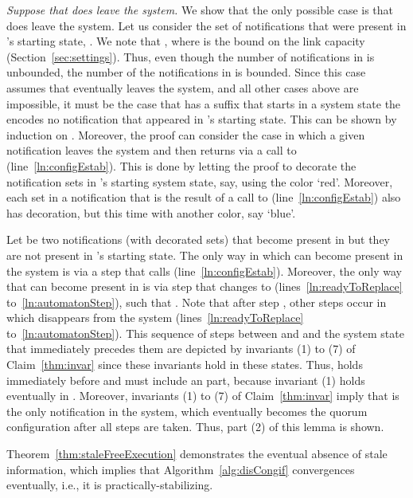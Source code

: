 \documentclass[11pt]{article}
\newenvironment{proof}{\noindent{\bf Proof.}}{\hfill}
\begin{document}
\begin{proof}
\noindent \textit{Suppose that  does leave the system.}
We show that the only possible case is that  does leave the system. Let us  consider the set  of notifications that were present in 's starting state, . We note that , where  is the bound on the link capacity (Section~\ref{sec:settings}). Thus, even though the number of notifications in  is unbounded, the number of the notifications in  is bounded. Since this case assumes that  eventually leaves the system, and all other cases above are impossible, it must be the case that  has a suffix  that starts in a system state  the encodes no notification that appeared in 's starting state. This can be shown by induction on . Moreover, the proof can consider the case in which a given notification  leaves the system and then returns via a call to  (line~\ref{ln:configEstab}). This is done by letting the proof to decorate the notification sets in 's starting system state, say, using the color `red'. Moreover, each set in a notification that is the result of a call to  (line~\ref{ln:configEstab}) also has  decoration, but this time with another color, say `blue'. 


Let  be two notifications (with decorated sets) that become present in  but they are not present in 's starting state. The only way in which   can become present in the system is via a step  that calls  (line~\ref{ln:configEstab}). Moreover, the only way that  can become present in  is via step  that changes  to  (lines~\ref{ln:readyToReplace} to~\ref{ln:automatonStep}), such that . 
Note that after step , other steps  occur in which  disappears from the system (lines~\ref{ln:readyToReplace} to~\ref{ln:automatonStep}). This sequence of steps between  and  and the system state that immediately precedes them are depicted by invariants (1) to (7) of Claim~\ref{thm:invar} since these invariants hold in these states. Thus,  holds immediately before  and  must include an  part, because invariant (1) holds eventually in . Moreover, invariants (1) to (7) of Claim~\ref{thm:invar} imply that  is the only notification in the system, which eventually becomes the quorum configuration after all steps  are taken. Thus, part (2) of this lemma is shown.  
\end{proof}




Theorem~\ref{thm:staleFreeExecution} demonstrates the eventual absence of stale information, which implies that Algorithm~\ref{alg:disCongif} convergences eventually, i.e., it is practically-stabilizing. 
\end{document}
